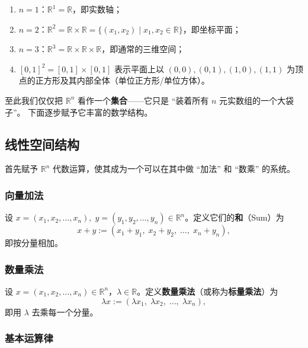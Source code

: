 \documentclass[lang=cn,11pt]{elegantbook}
\begin{document}
\begin{exercise}[低维特例]
\begin{enumerate}
  \item[(1)] $n=1$：$\mathbb R^1=\mathbb R$，即实数轴；
  \item[(2)] $n=2$：$\mathbb R^2=\mathbb R\times\mathbb R=\{(x_1,x_2)\mid x_1,x_2\in\mathbb R\}$，即坐标平面；
  \item[(3)] $n=3$：$\mathbb R^3=\mathbb R\times\mathbb R\times\mathbb R$，即通常的三维空间；
  \item[(4)] $[0,1]^2=[0,1]\times[0,1]$ 表示平面上以 $(0,0),(0,1),(1,0),(1,1)$ 为顶点的正方形及其内部全体（单位正方形/单位方体）。
\end{enumerate}
\end{exercise}

至此我们仅仅把 $\mathbb R^n$ 看作一个\textbf{集合}——它只是 ``装着所有 $n$ 元实数组的一个大袋子''。
下面逐步赋予它丰富的数学结构。


\subsection{线性空间结构}

首先赋予 $\mathbb R^n$ 代数运算，使其成为一个可以在其中做 ``加法'' 和 ``数乘'' 的系统。

\subsubsection{向量加法}

\begin{definition}[向量加法] \label{def:addition}
设 $x=(x_1,x_2,\dots,x_n),\;y=(y_1,y_2,\dots,y_n)\in\mathbb R^n$。定义它们的\textbf{和}（Sum）为
\[
x+y:=(x_1+y_1,\;x_2+y_2,\;\dots,\;x_n+y_n),
\]
即按分量相加。
\end{definition}

\subsubsection{数量乘法}

\begin{definition} \label{def:scalar-mult}
设 $x=(x_1,x_2,\dots,x_n)\in\mathbb R^n$，$\lambda\in\mathbb R$。定义\textbf{数量乘法}（或称为\textbf{标量乘法}）为
\[
\lambda x:=(\lambda x_1,\;\lambda x_2,\;\dots,\;\lambda x_n),
\]
即用 $\lambda$ 去乘每一个分量。
\end{definition}

\subsubsection{基本运算律}
\end{document}
